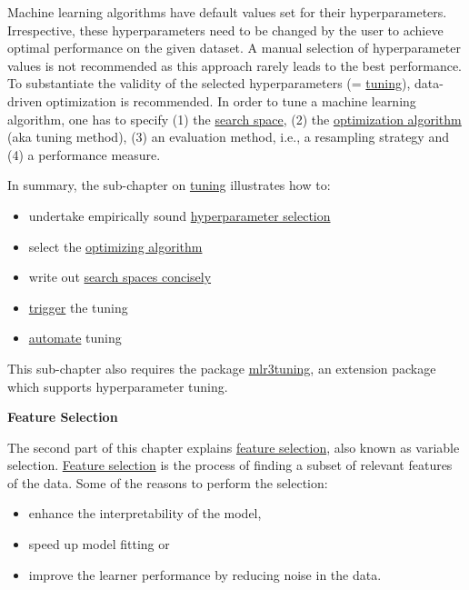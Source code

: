 \documentclass[
]{scrbook}
\providecommand{\tightlist}{%
  \setlength{\itemsep}{0pt}\setlength{\parskip}{0pt}}
\begin{document}
Machine learning algorithms have default values set for their hyperparameters.
Irrespective, these hyperparameters need to be changed by the user to achieve optimal performance on the given dataset.
A manual selection of hyperparameter values is not recommended as this approach rarely leads to the best performance.
To substantiate the validity of the selected hyperparameters (= \protect\hyperlink{tuning}{tuning}), data-driven optimization is recommended.
In order to tune a machine learning algorithm, one has to specify (1) the \protect\hyperlink{tuning-optimization}{search space}, (2) the \protect\hyperlink{tuning-algorithms}{optimization algorithm} (aka tuning method), (3) an evaluation method, i.e., a resampling strategy and (4) a performance measure.

In summary, the sub-chapter on \protect\hyperlink{tuning}{tuning} illustrates how to:

\begin{itemize}
\tightlist
\item
  undertake empirically sound \protect\hyperlink{tuning}{hyperparameter selection}
\item
  select the \protect\hyperlink{tuning-optimization}{optimizing algorithm}
\item
  write out \protect\hyperlink{searchspace}{search spaces concisely}
\item
  \protect\hyperlink{tuning-triggering}{trigger} the tuning
\item
  \protect\hyperlink{autotuner}{automate} tuning
\end{itemize}

This sub-chapter also requires the package \href{https://mlr3tuning.mlr-org.com}{mlr3tuning}, an extension package which supports hyperparameter tuning.

\textbf{Feature Selection}

The second part of this chapter explains \protect\hyperlink{fs}{feature selection}, also known as variable selection.
\protect\hyperlink{fs}{Feature selection} is the process of finding a subset of relevant features of the data.
Some of the reasons to perform the selection:

\begin{itemize}
\tightlist
\item
  enhance the interpretability of the model,
\item
  speed up model fitting or
\item
  improve the learner performance by reducing noise in the data.
\end{itemize}
\end{document}
